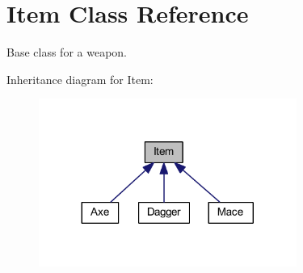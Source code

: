 \hypertarget{class_item}{}\section{Item Class Reference}
\label{class_item}


Base class for a weapon.  




Inheritance diagram for Item\+:\nopagebreak
\begin{figure}[H]
\begin{center}
\leavevmode
\includegraphics[width=239pt]{class_item__inherit__graph}
\end{center}
\end{figure}

